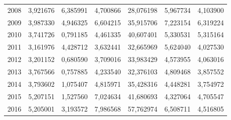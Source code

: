 \begin{table}
\begin{tabular}{p{1cm}p{2cm}p{2cm}p{2cm}p{2cm}p{2cm}p{2cm}}
 2008 &                            3,921676 &                                     6,385991 &                                    4,700866 &                           28,076198 &                    5,967734 &                     4,103900 \\
 2009 &                            3,987330 &                                     4,946325 &                                    6,604215 &                           35,915706 &                    7,223154 &                     6,319224 \\
 2010 &                            3,741726 &                                     0,791185 &                                    4,461335 &                           40,607401 &                    5,330531 &                     5,315164 \\
 2011 &                            3,161976 &                                     4,428712 &                                    3,632441 &                           32,665969 &                    5,624040 &                     4,027530 \\
 2012 &                            3,201152 &                                     0,680590 &                                    3,709016 &                           33,983429 &                    4,573955 &                     4,063016 \\
 2013 &                            3,767566 &                                     0,757885 &                                    4,233540 &                           32,376103 &                    4,809468 &                     3,857552 \\
 2014 &                            3,793602 &                                     1,075407 &                                    4,815971 &                           35,428316 &                    4,448281 &                     3,754972 \\
 2015 &                            5,207151 &                                     1,527560 &                                    7,024634 &                           41,680693 &                    4,327064 &                     4,705547 \\
 2016 &                            5,205001 &                                     3,193572 &                                    7,986568 &                           57,762974 &                    6,508711 &                     4,516805 \\
\bottomrule
\end{tabular}
\end{table}

